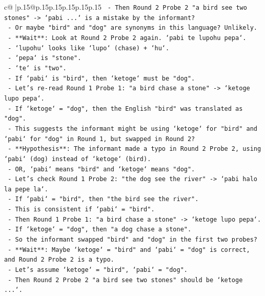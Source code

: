 \documentclass{article}
\begin{document}
{\begin{supertabular}{c@{$\;$}|p{.15\linewidth}@{}p{.15\linewidth}p{.15\linewidth}p{.15\linewidth}p{.15\linewidth}p{.15\linewidth}}
{{{\texttt{      {-} Then Round 2 Probe 2 "a bird see two stones" {-}> `pabi ...` is a mistake by the informant?} \\
\texttt{      {-} Or maybe "bird" and "dog" are synonyms in this language? Unlikely.} \\
\texttt{      {-} **Wait**: Look at Round 2 Probe 2 again. `pabi te lupohu pepa`.} \\
\texttt{      {-} `lupohu` looks like `lupo` (chase) + `hu`.} \\
\texttt{      {-} `pepa` is "stone".} \\
\texttt{      {-} `te` is "two".} \\
\texttt{      {-} If `pabi` is "bird", then `ketoge` must be "dog".} \\
\texttt{      {-} Let's re{-}read Round 1 Probe 1: "a bird chase a stone" {-}> `ketoge lupo pepa`.} \\
\texttt{      {-} If `ketoge` = "dog", then the English "bird" was translated as "dog".} \\
\texttt{      {-} This suggests the informant might be using `ketoge` for "bird" and `pabi` for "dog" in Round 1, but swapped in Round 2?} \\
\texttt{      {-} **Hypothesis**: The informant made a typo in Round 2 Probe 2, using `pabi` (dog) instead of `ketoge` (bird).} \\
\texttt{      {-} OR, `pabi` means "bird" and `ketoge` means "dog".} \\
\texttt{      {-} Let's check Round 1 Probe 2: "the dog see the river" {-}> `pabi halo la pepe la`.} \\
\texttt{      {-} If `pabi` = "bird", then "the bird see the river".} \\
\texttt{      {-} This is consistent if `pabi` = "bird".} \\
\texttt{      {-} Then Round 1 Probe 1: "a bird chase a stone" {-}> `ketoge lupo pepa`.} \\
\texttt{      {-} If `ketoge` = "dog", then "a dog chase a stone".} \\
\texttt{      {-} So the informant swapped "bird" and "dog" in the first two probes?} \\
\texttt{      {-} **Wait**: Maybe `ketoge` = "bird" and `pabi` = "dog" is correct, and Round 2 Probe 2 is a typo.} \\
\texttt{      {-} Let's assume `ketoge` = "bird", `pabi` = "dog".} \\
\texttt{      {-} Then Round 2 Probe 2 "a bird see two stones" should be `ketoge ...`.} \\
}}}
\end{supertabular}}
\end{document}
